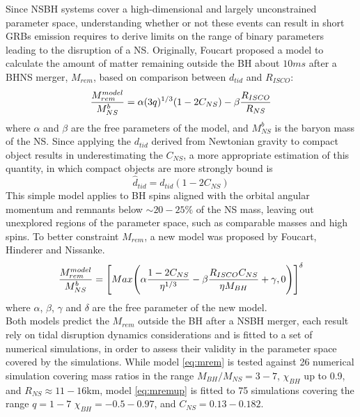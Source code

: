 \documentclass[binding=0.6cm, LaM]{sapthesis}
\begin{document}
        Since NSBH systems cover a high-dimensional and largely unconstrained parameter space,
        understanding whether or not these events can result in short GRBs emission requires to
        derive limits on the range of binary parameters leading to the disruption of a NS.
        Originally, Foucart proposed a model to calculate the amount of matter remaining
        outside the BH about $10ms$ after a BHNS merger, $M_{rem}$, based on comparison
        between $d_{tid}$ and $R_{ISCO}$:
                \begin{equation}
                \label{eq:mrem}
                        {{M_{rem}^{model}} \over {M^b_{NS}}} = \alpha(3q)^{1/3}(1 - 2C_{NS}) - \beta{{R_{ISCO}} \over {R_{NS}}}
                \end{equation}
        where $\alpha$ and $\beta$ are the free parameters of the model,
        and $M^b_{NS}$ is the baryon mass of the NS.
        Since applying the $d_{tid}$ derived from Newtonian gravity to compact object results in underestimating the $C_{NS}$,
        a more appropriate estimation of this quantity, in which compact objects are more strongly bound is
                \begin{equation}
                       \hat{d}_{tid} = d_{tid} (1 - 2C_{NS})
                \end{equation}
        This simple model applies to BH spins aligned with the orbital angular momentum and remnants below
        $\sim 20-25\%$ of the NS mass, leaving out unexplored regions of the parameter space,
        such as comparable masses and high spins.
        To better constraint $M_{rem}$, a new model was proposed by Foucart, Hinderer and Nissanke.
                \begin{equation}
                \label{eq:mremup}  
                        {{M_{rem}^{model}} \over {M^b_{NS}}} = \Bigg[ Max \Bigg( \alpha{{1 - 2C_{NS}} \over {\eta^{1/3}}} - \beta {{R_{ISCO}C_{NS}} \over{\eta M_{BH}}} + \gamma, 0 \Bigg)\Bigg]^{\delta}
                \end{equation}
        where $\alpha$, $\beta$, $\gamma$ and $\delta$ are the free parameter of the new model. \\
        Both models predict the $M_{rem}$ outside the BH after a NSBH merger,
        each result rely on tidal disruption dynamics considerations and
        is fitted to a set of numerical simulations,
        in order to assess their validity in the parameter space covered by the simulations.
        While model \ref{eq:mrem} is tested against 26 numerical simulation covering mass ratios
        in the range $M_{BH}/M_{NS}=3-7$, $\chi_{BH}$ up to 0.9, and $R_{NS} \approx 11-16$km,
        model \ref{eq:mremup} is fitted to 75 simulations covering the range $q = 1-7$ $\chi_{BH} =-0.5-0.97$,
        and $C_{NS} = 0.13-0.182$.
\end{document}
